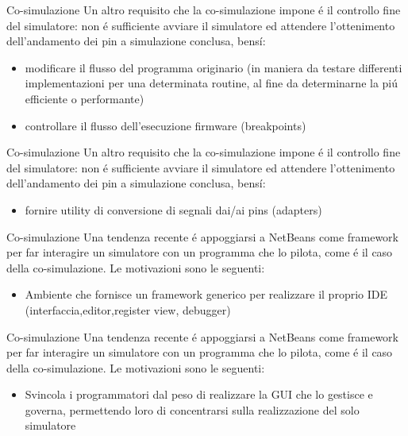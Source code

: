 \documentclass{beamer}
\begin{document}
\begin{frame}{Co-simulazione}
Un altro requisito che la co-simulazione impone \'e il controllo fine del simulatore: non \'e sufficiente avviare il simulatore ed
attendere l'ottenimento dell'andamento dei pin a simulazione conclusa, bens\'i:
\begin{itemize}
  \item  modificare il flusso del programma originario (in maniera da testare differenti implementazioni per una determinata routine, al
  fine da determinarne la pi\'u efficiente o performante)
  \item controllare il flusso dell'esecuzione firmware (breakpoints)
\end{itemize}
\end{frame}

\begin{frame}{Co-simulazione}
Un altro requisito che la co-simulazione impone \'e il controllo fine del simulatore: non \'e sufficiente avviare il simulatore ed
attendere l'ottenimento dell'andamento dei pin a simulazione conclusa, bens\'i:
\begin{itemize}
  \item fornire utility di conversione di segnali dai/ai pins (adapters)
\end{itemize}
\end{frame}

\begin{frame}{Co-simulazione}
Una tendenza recente \'e appoggiarsi a NetBeans come framework per far interagire un simulatore con un programma che lo pilota, come
\'e il caso della co-simulazione. Le motivazioni sono le seguenti:
\begin{itemize}
  \item  Ambiente che fornisce un framework generico per realizzare il proprio IDE (interfaccia,editor,register view, debugger)
\end{itemize}
\end{frame}

\begin{frame}{Co-simulazione}
Una tendenza recente \'e appoggiarsi a NetBeans come framework per far interagire un simulatore con un programma che lo pilota, come
\'e il caso della co-simulazione. Le motivazioni sono le seguenti:
\begin{itemize}
  \item  Svincola i programmatori dal peso di realizzare la GUI che lo gestisce e governa, permettendo loro di concentrarsi sulla
 realizzazione del solo simulatore
\end{itemize}
\end{frame}
\end{document}
